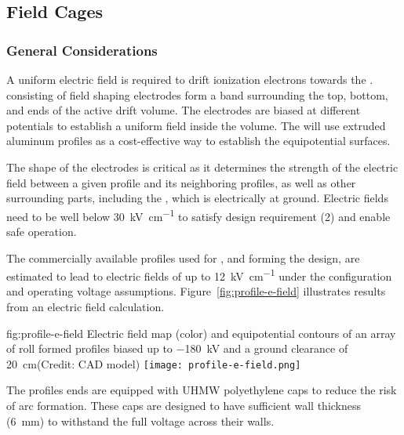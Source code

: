 \subsection{Field Cages}
\subsubsection{General Considerations}

A uniform electric field is required to drift ionization electrons towards the .  consisting of field shaping electrodes form a band surrounding the top, bottom, and ends of the active drift volume. The electrodes are biased at different potentials to establish a uniform field inside the  volume.
The  will use extruded aluminum profiles as a cost-effective way to establish the equipotential surfaces. 

The shape of the electrodes is critical as it determines the strength of the electric field between a given profile and its neighboring profiles, as well as
other surrounding parts, including the , which is electrically at ground. %
Electric fields need to be well below \SI{30}{\kilo\volt\per\centi\meter} 
to satisfy design requirement (2) and enable safe  operation. %

The commercially available profiles used for , and forming the  design, are estimated to lead to electric fields of up to \SI{12}{\kilo\volt\per\centi\meter} under the %
configuration and operating voltage assumptions.
Figure~\ref{fig:profile-e-field} illustrates results from an electric field calculation.

\begin{dunefigure}
{fig:profile-e-field}
{Electric field map (color) and equipotential contours of an array of roll formed profiles biased up to \SI{-180}{\kilo\volt} and a ground clearance of \SI{20}{\centi\meter}(Credit: CAD model)} \texttt{[image: profile-e-field.png]}
\end{dunefigure}

The profiles ends are equipped with UHMW polyethylene caps to reduce the risk of arc formation.  These caps are designed to have sufficient wall thickness (\SI{6}{\milli\meter}) to withstand the full voltage across their walls.

